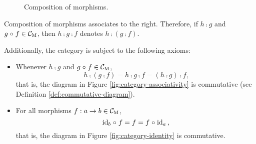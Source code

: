 \begin{definition}
\begin{itemize}
\begin{figure}[htbp]
\begin{center}
      \end{center}
      \caption{Composition of morphisms.}
      \label{fig:category-composition}
    \end{figure}

    Composition of morphisms associates to the right. Therefore, if $h
    \comp g$ and $g \mathrel{\circ} f \in \mathcal{C}_{\operatorname{M}}$, then $h \comp g \comp f$
    denotes $h \comp (g \comp f)$.

  \end{itemize}
  Additionally, the category  is subject to the following
  axioms:
  \begin{itemize}
  \item

    Whenever $h \comp g$ and $g \mathrel{\circ} f \in \mathcal{C}_{\operatorname{M}}$,
    \begin{equation}
      \label{eq:category-associativity}
      h \comp (g \comp f) = h \comp g \comp f = (h \comp g) \comp f
      \text{,}
    \end{equation}
    that is, the diagram in Figure \ref{fig:category-associativity} is
    commutative (see Definition \ref{def:commutative-diagram}).

  \item

    For all morphisms $f: a \to b \in \mathcal{C}_{\operatorname{M}}$,
    \begin{equation}
      \label{eq:category-identity}
      \operatorname{id}_{b} \mathrel{\circ} f = f = f \mathrel{\circ} \operatorname{id}_{a}
      \text{,}
    \end{equation}
    that is, the diagram in Figure \ref{fig:category-identity} is
    commutative.

    \begin{figure}
      \begin{subfigure}[b]{0.5\linewidth}
        \begin{center}
\end{center}
\end{subfigure}
\end{figure}
\end{itemize}
\end{definition}
